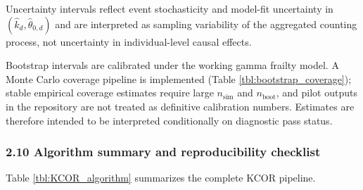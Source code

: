 \documentclass[
]{article}
\begin{document}
Uncertainty intervals reflect event stochasticity and model-fit
uncertainty in \((\hat{k}_d,\hat{\theta}_{0,d})\) and are interpreted as
sampling variability of the aggregated counting process, not uncertainty
in individual-level causal effects.

Bootstrap intervals are calibrated under the working gamma frailty
model. A Monte Carlo coverage pipeline is implemented (Table
\ref{tbl:bootstrap_coverage}); stable empirical coverage estimates require
large \(n_{\mathrm{sim}}\) and \(n_{\mathrm{boot}}\), and pilot outputs in
the repository are not treated as definitive calibration numbers. Estimates
are therefore intended to be interpreted conditionally on diagnostic pass
status.

\subsubsection{2.10 Algorithm summary and reproducibility
checklist}\label{algorithm-summary-and-reproducibility-checklist}

Table \ref{tbl:KCOR_algorithm} summarizes the complete KCOR pipeline.
\end{document}

